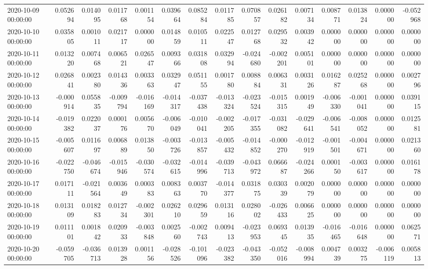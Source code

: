 \begin{tabular}{lrrrrrrrrrrrrrr}
2020-10-09 00:00:00 & 0.052694 & 0.014095 & 0.011768 & 0.001154 & 0.039664 & 0.085284 & 0.011785 & 0.070857 & 0.026182 & 0.007134 & 0.008771 & 0.013824 & 0.000000 & -0.052968 \\
2020-10-10 00:00:00 & 0.035805 & 0.001011 & 0.021717 & 0.000000 & 0.014859 & 0.010511 & 0.022547 & 0.012768 & 0.029532 & 0.003942 & 0.000000 & 0.000000 & 0.000000 & 0.000000 \\
2020-10-11 00:00:00 & 0.013220 & 0.007468 & 0.006521 & 0.026547 & 0.009366 & 0.031808 & 0.032994 & -0.024680 & -0.002201 & 0.005101 & 0.000000 & 0.000000 & 0.000000 & 0.000000 \\
2020-10-12 00:00:00 & 0.026841 & 0.002380 & 0.014336 & 0.003363 & 0.032947 & 0.051155 & 0.001780 & 0.008884 & 0.006331 & 0.003126 & 0.016287 & 0.025268 & 0.000000 & 0.002796 \\
2020-10-13 00:00:00 & -0.000914 & 0.055835 & -0.009794 & -0.016169 & -0.014317 & -0.037438 & -0.013324 & -0.023524 & -0.015315 & 0.001949 & -0.006330 & -0.001041 & 0.000000 & 0.039115 \\
2020-10-14 00:00:00 & -0.019382 & 0.022037 & 0.000176 & 0.005670 & -0.006049 & -0.010041 & -0.002205 & -0.017355 & -0.031082 & -0.029641 & -0.006541 & -0.008052 & 0.000000 & 0.012581 \\
2020-10-15 00:00:00 & -0.005607 & 0.011697 & 0.006889 & 0.013850 & -0.003726 & -0.013857 & -0.005432 & -0.014852 & -0.000270 & -0.012919 & -0.001501 & -0.004671 & 0.000000 & 0.021360 \\
2020-10-16 00:00:00 & -0.022750 & -0.046674 & -0.015946 & -0.030574 & -0.032615 & -0.014996 & -0.039713 & -0.043972 & 0.066687 & -0.024266 & 0.000150 & -0.003617 & 0.000000 & 0.016178 \\
2020-10-17 00:00:00 & 0.017111 & -0.021564 & 0.003649 & 0.000383 & 0.008363 & 0.003770 & -0.014377 & 0.031875 & 0.030339 & 0.002079 & 0.000000 & 0.000000 & 0.000000 & 0.000000 \\
2020-10-18 00:00:00 & 0.013109 & 0.018283 & 0.012734 & -0.002301 & 0.026210 & 0.029659 & 0.013116 & 0.028002 & -0.026433 & 0.006625 & 0.000000 & 0.000000 & 0.000000 & 0.000000 \\
2020-10-19 00:00:00 & 0.011101 & 0.001842 & 0.020933 & -0.003848 & 0.002560 & -0.002743 & 0.009413 & -0.023953 & 0.069345 & 0.013935 & -0.016465 & -0.016648 & 0.000000 & 0.062571 \\
2020-10-20 00:00:00 & -0.059705 & -0.036713 & 0.013928 & 0.001156 & -0.028526 & -0.101096 & -0.023382 & -0.043350 & -0.052016 & -0.008994 & 0.004739 & 0.003275 & -0.006119 & 0.005813 \\

\end{tabular}
